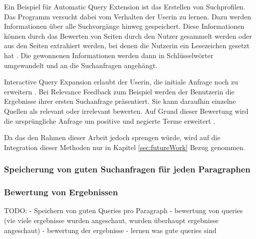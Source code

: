 Ein Beispiel für Automatic Query Extension ist das Erstellen von Suchprofilen. Das Programm versucht dabei vom Verhalten der Userin zu lernen. Dazu werden Informationen über alle Suchvorgänge hinweg gespeichert. Diese Informationen können durch das Bewerten von Seiten durch den Nutzer gesammelt werden oder aus den Seiten extrahiert werden, bei denen die Nutzerin ein Lesezeichen gesetzt hat \cite{budzik2000user}. Die gewonnenen Informationen werden dann in Schlüsselwörter umgewandelt und an die Suchanfragen angehängt.

 Interactive Query Expansion erlaubt der Userin, die initiale Anfrage noch zu erweitern \cite{harman1988towards}. Bei Relevance Feedback zum Beispiel werden der Benutzerin die Ergebnisse ihrer ersten Suchanfrage präsentiert. Sie kann daraufhin einzelne Quellen als relevant oder irrelevant bewerten. Auf Grund dieser Bewertung wird die ursprüngliche Anfrage um positive und negierte Terme erweitert \cite{budzik2000user}.

 Da das den Rahmen dieser Arbeit jedoch sprengen würde, wird auf die Integration dieser Methoden nur in Kapitel \ref{sec:futureWork} Bezug genommen.

  \subsubsection{Speicherung von guten Suchanfragen für jeden Paragraphen}
  \subsubsection{Bewertung von Ergebnissen}


 TODO: 
 - Speichern von guten Queries pro Paragraph
 - bewertung von queries (vie viele ergebnisse wurden angeschaut, wurden überhaupt ergebnisse angeschaut)
 - bewertung der ergebnisse
 - lernen was gute queries sind
